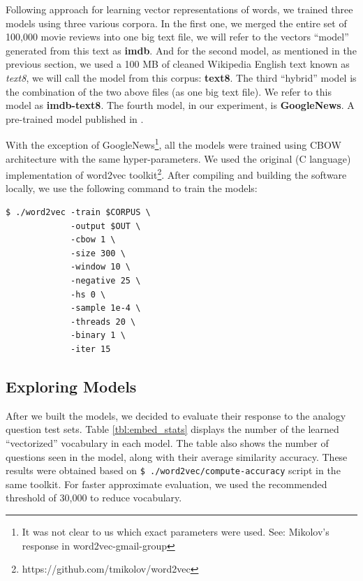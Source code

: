 \documentclass[11pt,letterpaper]{article}
\begin{document}
Following \citep{Mikolov:2013wc} approach for learning vector
representations of words, we trained three models using three various
corpora. In the first one, we merged the entire set of 100,000 movie
reviews \citep{maas2011learning} into one big text file, we will refer
to the vectors ``model'' generated from this text as \textbf{imdb}. And
for the second model, as mentioned in the previous section, we used a
100 MB of cleaned Wikipedia English text known as \emph{text8}, we will
call the model from this corpus: \textbf{text8}. The third ``hybrid''
model is the combination of the two above files (as one big text file).
We refer to this model as \textbf{imdb-text8}. The fourth model, in our
experiment, is \textbf{GoogleNews}. A pre-trained model published in
\citep{Mikolov:2013wc}.

With the exception of
GoogleNews\footnote{It was not clear to us which exact parameters were used. See: Mikolov's response in word2vec-gmail-group},
all the models were trained using CBOW architecture with the same
hyper-parameters. We used the original (C language) implementation of
word2vec toolkit\footnote{https://github.com/tmikolov/word2vec}. After
compiling and building the software locally, we use the following
command to train the models:

\begin{verbatim}
$ ./word2vec -train $CORPUS \
             -output $OUT \
             -cbow 1 \
             -size 300 \
             -window 10 \
             -negative 25 \
             -hs 0 \
             -sample 1e-4 \
             -threads 20 \
             -binary 1 \
             -iter 15
\end{verbatim}

\subsection{Exploring Models}\label{exploring-models}

After we built the models, we decided to evaluate their response to the
analogy question test sets. 
Table \ref{tbl:embed_stats} displays the number of the learned ``vectorized'' vocabulary in each model. 
The table also shows the number of questions seen in the model,
along with their average similarity accuracy. These results were
obtained based on \texttt{\$\ ./word2vec/compute-accuracy} script in the
same toolkit. For faster approximate evaluation, we used the recommended
threshold of 30,000 to reduce vocabulary.
\end{document}
